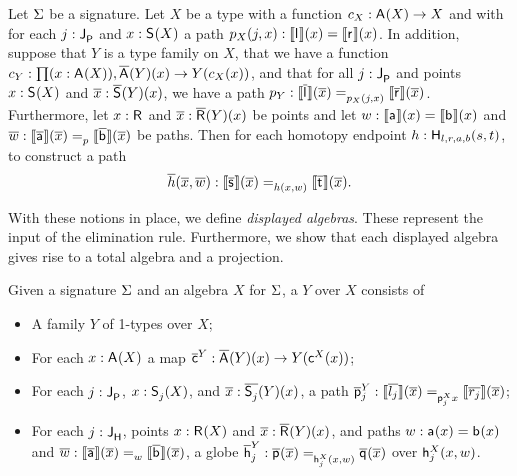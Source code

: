 \begin{problem}
\label{prob:homot_dact}
Let $\sign$ be a signature.
Let $X$ be a type with a function $c_X : \polyAct{\pointconstr}{X} \rightarrow X$
and with for each $j : \pathlabel$ and $x : \polyAct{\patharg}{X}$ a path $p_X(j, x) : \semE{\pathleft}(x) = \semE{\pathright}(x)$.
In addition, suppose that $Y$ is a type family on $X$,
that we have a function $c_Y : \depprod{(x : \polyAct{\pointconstr}{X})}{\polyDact{\pointconstr}{Y}(x) \rightarrow Y(c_X(x))}$,
and that for all $j  : \pathlabel$ and points $x : \polyAct{\patharg}{X}$ and $\xx : \polyDact{\patharg}{Y}(x)$,
we have a path $p_Y : \pathover{p_X(j, x)}{\pathendpointDact{\pathleft}{\xx}}{\pathendpointDact{\pathright}{\xx}}$.
Furthermore, let $x : \homotpointarg$ and $\xx : \polyDact{\homotpointarg}{Y}(x)$ be points
and let $w : \semE{\pathargleft}(x) = \semE{\pathargright}(x)$
and $\disp{w} : \pathover{p}{\pathendpointDact{\pathargleft}{\xx}}{\pathendpointDact{\pathargright}{\xx}}$
be paths.
Then for each homotopy endpoint $h : \homotendpoint{l}{r}{a}{b}{s}{t}$, 
to construct a path
\[
\homotendpointDact{h}{\xx, \disp{w}} : \pathover{\homotendpointAct{h}{x, w}}{\pathendpointDact{\homotpathleft}{\xx}}{\pathendpointDact{\homotpathright}{\xx}}.
\]
\end{problem}

With these notions in place, we define \emph{displayed algebras}.
These represent the input of the elimination rule.
Furthermore, we show that each displayed algebra gives rise to a total algebra and a projection.

\begin{definition}\label{def:disp_alg}
Given a signature $\sign$ and an algebra $X$ for $\sign$,
a  $Y$ over $X$ consists of
\begin{itemize}
	\item A family $Y$ of 1-types over $X$;
	\item For each $x : \polyAct{\pointconstr}{X}$ a map $\DispAlgPoint{Y} : \polyDact{\pointconstr}{Y}(x) \rightarrow Y(\AlgPoint{X}(x))$;
	\item For each $j : \pathlabel$, $x : \polyAct{\patharg_j}{X}$, and $\pover{x} : \polyDact{\patharg_j}{Y}(x)$, a path
	$
	\DispAlgPath{Y}{j} : \pathover{\AlgPath{X}{j}{x}}{\pathendpointDact{l_j}{\pover{x}}}{\pathendpointDact{r_j}{\pover{x}}}
	$;
	\item For each $j : \homotlabel$, points $x : \polyAct{\homotpointarg}{X}$ and $\pover{x} : \polyDact{\homotpointarg}{Y}(x)$,
	and paths $w : \pathargleft(x) = \pathargright(x)$ and $\pover{w} : \pathover{w}{\pathendpointDact{\pathargleft}{\pover{x}}}{\pathendpointDact{\pathargright}{\pover{x}}}$,
	a globe
	$
	\DispAlgHomot{Y}{j} : \globeover{\AlgHomot{X}{j}{(x, w)}}{\homotendpointDact{\homotleft}{\xx}}{\homotendpointDact{\homotright}{\xx}}
	$
	over $\AlgHomot{X}{j}{(x, w)}$.
\end{itemize}
\end{definition}

